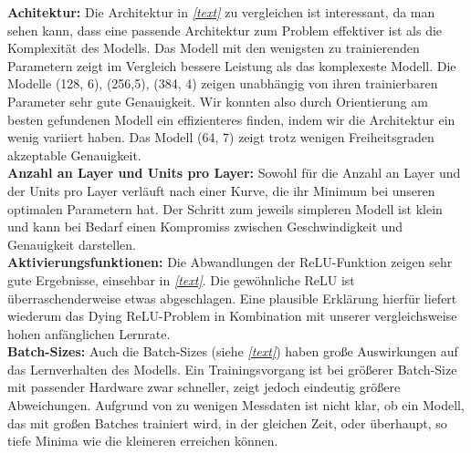 \newline
\textbf{Achitektur:} %
Die Architektur in \textit{\autoref{text}} zu vergleichen ist interessant, da man sehen kann, dass eine passende Architektur zum Problem effektiver ist als die Komplexität des Modells. Das Modell mit den wenigsten zu trainierenden Parametern zeigt im Vergleich bessere Leistung als das komplexeste Modell. Die Modelle (128, 6), (256,5), (384, 4) zeigen unabhängig von ihren trainierbaren Parameter sehr gute Genauigkeit. Wir konnten also durch Orientierung am besten gefundenen Modell ein effizienteres finden, indem wir die Architektur ein wenig variiert haben. Das Modell (64, 7) zeigt trotz wenigen Freiheitsgraden akzeptable Genauigkeit. \\
\newline
\textbf{Anzahl an Layer und Units pro Layer:} %
Sowohl für die Anzahl an Layer und der Units pro Layer verläuft nach einer Kurve, die ihr Minimum bei unseren optimalen Parametern hat. Der Schritt zum jeweils simpleren Modell ist klein und kann bei Bedarf einen Kompromiss zwischen Geschwindigkeit und Genauigkeit darstellen. \\
\newline
\textbf{Aktivierungsfunktionen:} %
Die Abwandlungen der ReLU-Funktion zeigen sehr gute Ergebnisse, einsehbar in \textit{\autoref{text}}. Die gewöhnliche ReLU ist überraschenderweise etwas abgeschlagen. Eine plausible Erklärung hierfür liefert wiederum das \grqq Dying ReLU\grqq-Problem in Kombination mit unserer vergleichsweise hohen anfänglichen Lernrate.  \\
\newline
\textbf{Batch-Sizes:}
Auch die Batch-Sizes (siehe \textit{\autoref{text}}) haben große Auswirkungen auf das Lernverhalten des Modells. Ein Trainingsvorgang ist bei größerer Batch-Size mit passender Hardware zwar schneller, zeigt jedoch eindeutig größere Abweichungen. Aufgrund von zu wenigen Messdaten ist nicht klar, ob ein Modell, das mit großen Batches trainiert wird, in der gleichen Zeit, oder überhaupt, so tiefe Minima wie die kleineren erreichen können. 


